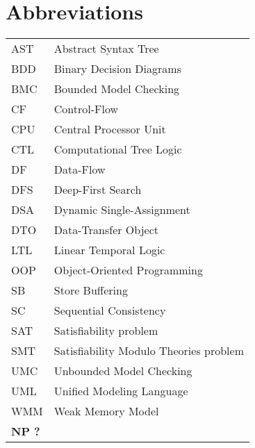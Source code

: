 \chapter*{Abbreviations}


\noindent
\begin{longtable}{@{}p{}p{}@{}}
AST & Abstract Syntax Tree \\
BDD & Binary Decision Diagrams \\
BMC & Bounded Model Checking \\
CF  & Control-Flow \\
CPU & Central Processor Unit \\
CTL & Computational Tree Logic \\
DF  & Data-Flow \\
DFS & Deep-First Search \\
DSA & Dynamic Single-Assignment \\
DTO & Data-Transfer Object \\
LTL & Linear Temporal Logic \\
OOP & Object-Oriented Programming \\
SB  & Store Buffering \\
SC  & Sequential Consistency \\
SAT & Satisfiability problem \\
SMT & Satisfiability Modulo Theories problem \\
UMC & Unbounded Model Checking \\
UML & Unified Modeling Language \\ %
WMM & Weak Memory Model \\
\textbf{NP ?} & \\
\end{longtable}


